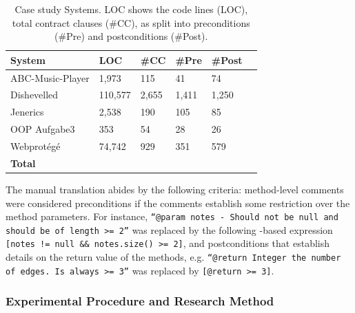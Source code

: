 \begin{table}[ht]
\caption{Case study Systems. LOC shows the code lines (LOC), total contract clauses (\#CC), as split
into preconditions (\#Pre) and postconditions (\#Post).}
\label{tab:Units}
\centering
\begin{tabular}{llllll}
\toprule
\bfseries System &  \bfseries LOC & 
\bfseries \#CC &  \bfseries \#Pre &  \bfseries \#Post \\ \hline
ABC-Music-Player & 1,973 & 115 & 41 & 74 \\ 
Dishevelled & 110,577 & 2,655 & 1,411 & 1,250\\ 
Jenerics & 2,538 & 190 & 105 & 85 \\ 
OOP Aufgabe3 & 353 & 54 & 28 & 26 \\
Webprot\'{e}g\'{e} & 74,742 & 929 & 351 & 579 \\ \hline

 \bfseries Total &  \bfseries \totalCode{} &  \bfseries
\totalClauses{} &  \bfseries \totalPre{} &  \bfseries \totalPost{}
\\
\bottomrule
\end{tabular}
\end{table}

The manual translation abides by the following criteria: method-level comments were considered preconditions
if the comments establish some restriction over the method parameters.
For instance, \texttt{``@param notes - Should not be null and should be of length >= 2''} was
replaced by the following \contractjdoc{}-based expression \texttt{[notes != null \&\& notes.size() >= 2]}, and
postconditions that establish details on the return value of the
methods, e.g. \texttt{``@return Integer the number of edges. Is always >= 3''}
was replaced by \texttt{[@return >= 3]}. 

\subsubsection{Experimental Procedure and Research Method} 


